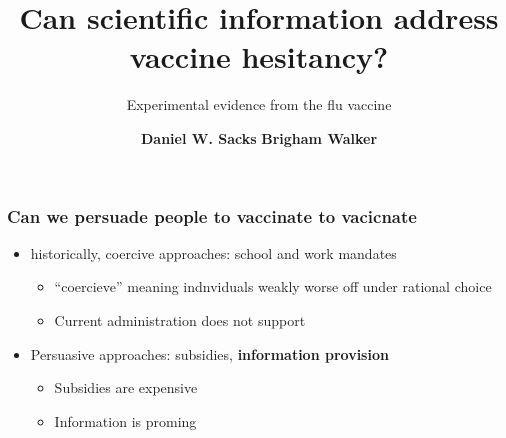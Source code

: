 \documentclass[13pt,svgnames,x11names,dvipsnames,aspectratio=169]{beamer}
\begin{document}

\title[]{Can scientific information address vaccine hesitancy?}
\subtitle{Experimental evidence from the flu vaccine}

\author[Sacks \& Walker]{
	\textbf{Daniel W. Sacks} \quad
	\textbf{Brigham Walker}
}


\date{}

\begin{frame}
	\vfill
	\titlepage
\end{frame}


\begin{frame}
\frametitle{Can we persuade people to vaccinate  to vacicnate}
\begin{itemize}
  \item historically, coercive approaches: school and work mandates 
  \begin{itemize}
    \item ``coercieve'' meaning indnviduals weakly worse off under rational choice
    \item Current administration does not support 
  \end{itemize}
  \item Persuasive approaches: subsidies, \textbf{information provision}
  \begin{itemize}
    \item Subsidies are expensive 
    \item Information is proming 
  \end{itemize}
\end{itemize}
\end{frame}
\end{document}
